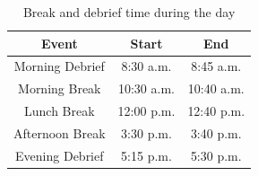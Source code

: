 \begin{table}[h]
    \centering
        \caption{Break and debrief time during the day}
    \begin{tabular}{|c|c|c|}
        \hline
         \textbf{Event}& \textbf{Start} & \textbf{End}\\ \hline
         \hline
         Morning Debrief& 8:30 a.m.  & 8:45 a.m. \\ \hline
         Morning Break& 10:30 a.m.  & 10:40 a.m. \\ \hline
         Lunch Break& 12:00 p.m. & 12:40 p.m.\\ \hline
         Afternoon Break& 3:30 p.m. & 3:40 p.m. \\ \hline
         Evening Debrief& 5:15 p.m. & 5:30 p.m.\\ \hline
    \end{tabular}
    \label{tab:break-debrief-times}
\end{table}

